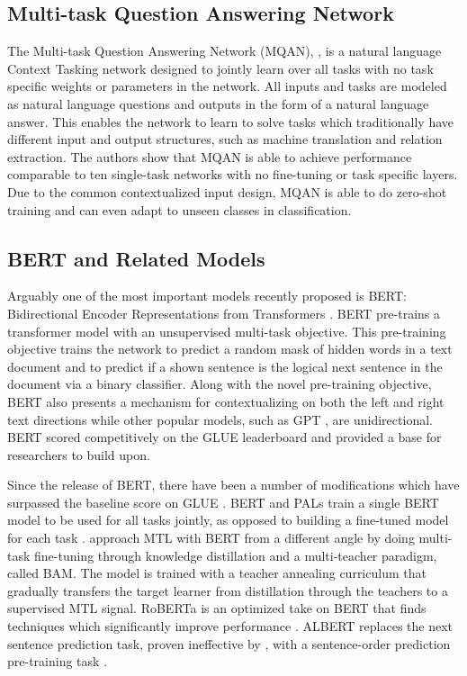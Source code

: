 \documentclass[twocolumn]{article}
\begin{document}
\subsection{Multi-task Question Answering Network}
The Multi-task Question Answering Network (MQAN), \citep{decanlp18}, is a natural language Context Tasking network designed to jointly learn over all tasks with no task specific weights or parameters in the network. All inputs and tasks are modeled as natural language questions and outputs in the form of a natural language answer. This enables the network to learn to solve tasks which traditionally have different input and output structures, such as machine translation and relation extraction. The authors show that MQAN is able to achieve performance comparable to ten single-task networks with no fine-tuning or task specific layers. Due to the common contextualized input design, MQAN is able to do zero-shot training and can even adapt to unseen classes in classification.

\subsection{BERT and Related Models}
Arguably one of the most important models recently proposed is BERT: Bidirectional Encoder Representations from Transformers \citep{bert19}. BERT pre-trains a transformer model \citep{transformer17} with an unsupervised multi-task objective. This pre-training objective trains the network to predict a random mask of hidden words in a text document and to predict if a shown sentence is the logical next sentence in the document via a binary classifier. Along with the novel pre-training objective, BERT also presents a mechanism for contextualizing on both the left and right text directions while other popular models, such as GPT \citep{gpt18}, are unidirectional. BERT scored competitively on the GLUE leaderboard and provided a base for researchers to build upon.

Since the release of BERT, there have been a number of modifications which have surpassed the baseline score on GLUE \citep{bertonstilts18, spanbert19,albert19}. BERT and PALs train a single BERT model to be used for all tasks jointly, as opposed to building a fine-tuned model for each task \citep{bertandpals19}. \cite{bam19} approach MTL with BERT from a different angle by doing multi-task fine-tuning through knowledge distillation and a multi-teacher paradigm, called BAM. The model is trained with a teacher annealing curriculum that gradually transfers the target learner from distillation through the teachers to a supervised MTL signal. RoBERTa is an optimized take on BERT that finds techniques which significantly improve performance \citep{roberta19}. ALBERT replaces the next sentence prediction task, proven ineffective by \cite{xlnet19}, with a sentence-order prediction pre-training task \citep{albert19}.
\end{document}
